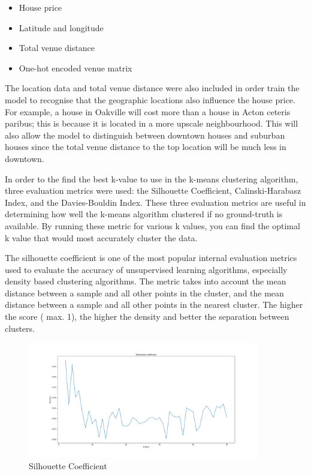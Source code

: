 \documentclass{article}
\begin{document}
\begin{itemize}
	\item House price
	\item Latitude and longitude
	\item Total venue distance
	\item One-hot encoded venue matrix
\end{itemize}

The location data and total venue distance were also included in order train the model to recognise that the geographic locations also influence the house price. For example, a house in Oakville will cost more than a house in Acton ceteris paribus; this is because it is located in a more upscale neighbourhood. This will also allow the model to distinguish between downtown houses and suburban houses since the total venue distance to the top location will be much less in downtown.  

In order to the find the best k-value to use in the k-means clustering algorithm, three evaluation metrics were used: the Silhouette Coefficient, Calinski-Harabasz Index, and the Davies-Bouldin Index. These three evaluation metrics are useful in determining how well the k-means algorithm clustered if no ground-truth is available. By running these metric for various k values, you can find the optimal k value that would most accurately cluster the data.

The silhouette coefficient is one of the most popular internal evaluation metrics used to evaluate the accuracy of unsupervised learning algorithms, especially density based clustering algorithms. The metric takes into account the mean distance between a sample and all other points in the cluster, and the mean distance between a sample and all other points in the nearest cluster. The higher the score ( max. 1), the higher the density and better the separation between clusters. 

\begin{figure}[h!]
	\centering
	\includegraphics[width=0.9\textwidth]{sil.png}
	\caption{Silhouette Coefficient}
	\label{sil}
\end{figure}
\end{document}
